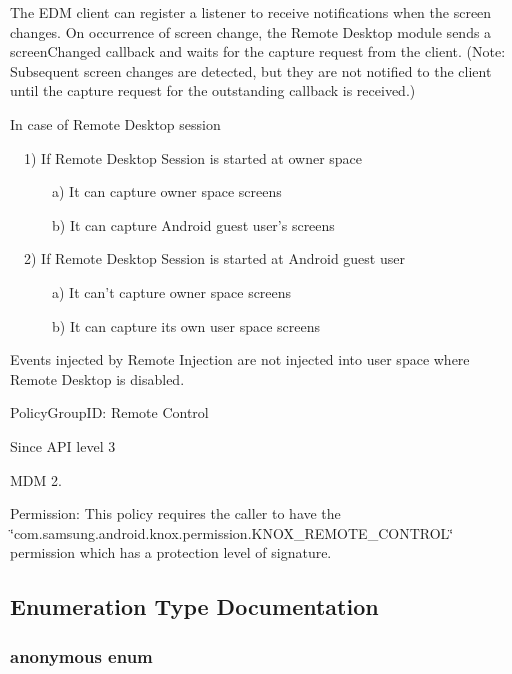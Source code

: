 \-The \-E\-D\-M client can register a listener to receive notifications when the screen changes. \-On occurrence of screen change, the \-Remote \-Desktop module sends a screen\-Changed callback and waits for the capture request from the client. (\-Note\-: \-Subsequent screen changes are detected, but they are not notified to the client until the capture request for the outstanding callback is received.)\par
 \par
 \-In case of \-Remote \-Desktop session\par
 ~~1) \-If \-Remote \-Desktop \-Session is started at owner space\par
 ~~~~~~a) \-It can capture owner space screens\par
 ~~~~~~b) \-It can capture \-Android guest user's screens\par


~~2) \-If \-Remote \-Desktop \-Session is started at \-Android guest user\par
 ~~~~~~a) \-It can't capture owner space screens\par
 ~~~~~~b) \-It can capture its own user space screens\par


\-Events injected by \-Remote \-Injection are not injected into user space where \-Remote \-Desktop is disabled. \par
 \begin{DoxyParagraph}{\-Policy\-Group\-I\-D\-: }
\-Remote \-Control 
\end{DoxyParagraph}
\begin{DoxySince}{\-Since}
\-A\-P\-I level 3 

\-M\-D\-M 2. 
\end{DoxySince}
\begin{DoxyParagraph}{\-Permission\-: }
\-This policy requires the caller to have the \char`\"{}com.\-samsung.\-android.\-knox.\-permission.\-K\-N\-O\-X\-\_\-\-R\-E\-M\-O\-T\-E\-\_\-\-C\-O\-N\-T\-R\-O\-L\char`\"{} permission which has a protection level of signature. 
\end{DoxyParagraph}


\subsection{\-Enumeration \-Type \-Documentation}
\hypertarget{namespaceknoxremotedesktop_abb203e9b63692eb529da34e7e68158ec}{\subsubsection[{anonymous enum}]{\setlength{\rightskip}{0pt plus 5cm}anonymous enum}}\label{namespaceknoxremotedesktop_abb203e9b63692eb529da34e7e68158ec}


